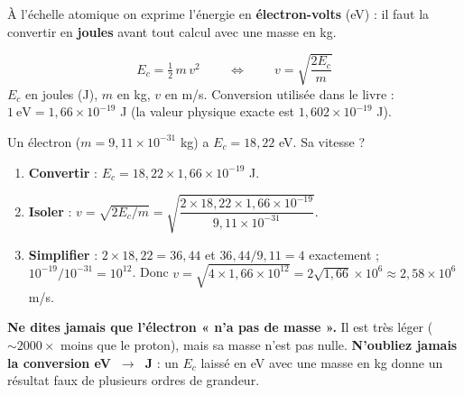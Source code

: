 \documentclass[11pt,a4paper]{article}
\begin{document}
À l'échelle atomique on exprime l'énergie en \textbf{électron-volts} (eV) : il faut la convertir en
\textbf{joules} avant tout calcul avec une masse en kg.

\begin{formule}
\[ \boxed{\,E_c = \tfrac{1}{2}\,m\,v^{2}\,}
   \qquad\Longleftrightarrow\qquad
   \boxed{\,v = \sqrt{\dfrac{2E_c}{m}}\,} \]
$E_c$ en joules (J), $m$ en kg, $v$ en m/s. Conversion utilisée dans le livre :
$1\ \text{eV} = 1{,}66\times10^{-19}$ J (la valeur physique exacte est $1{,}602\times10^{-19}$ J).
\end{formule}

\begin{ex}
Un électron ($m=9{,}11\times10^{-31}$ kg) a $E_c = 18{,}22$ eV. Sa vitesse ?
\begin{enumerate}
  \item \textbf{Convertir} : $E_c = 18{,}22\times1{,}66\times10^{-19}$ J.
  \item \textbf{Isoler} : $v=\sqrt{2E_c/m}=\sqrt{\dfrac{2\times18{,}22\times1{,}66\times10^{-19}}{9{,}11\times10^{-31}}}$.
  \item \textbf{Simplifier} : $2\times18{,}22=36{,}44$ et $36{,}44/9{,}11=4$ exactement ;
        $10^{-19}/10^{-31}=10^{12}$. Donc
        $v=\sqrt{4\times1{,}66\times10^{12}}=2\sqrt{1{,}66}\times10^{6}\approx 2{,}58\times10^{6}$ m/s.
\end{enumerate}
\end{ex}

\begin{piege}
\textbf{Ne dites jamais que l'électron « n'a pas de masse ».} Il est très léger ($\sim2000\times$ moins
que le proton), mais sa masse n'est pas nulle. \; \textbf{N'oubliez jamais la conversion eV~$\to$~J} :
un $E_c$ laissé en eV avec une masse en kg donne un résultat faux de plusieurs ordres de grandeur.
\end{piege}
\end{document}
